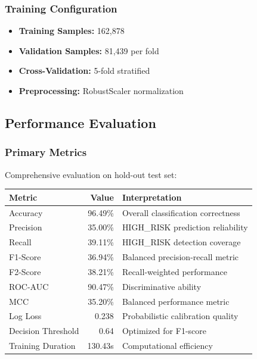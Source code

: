 \documentclass[11pt]{article}
\begin{document}
\subsubsection{Training Configuration}
\begin{itemize}[leftmargin=*]
\item \textbf{Training Samples:} 162,878
\item \textbf{Validation Samples:} 81,439 per fold
\item \textbf{Cross-Validation:} 5-fold stratified
\item \textbf{Preprocessing:} RobustScaler normalization
\end{itemize}

\subsection{Performance Evaluation}\label{sec:performance}

\subsubsection{Primary Metrics}
Comprehensive evaluation on hold-out test set:

\begin{center}
\begin{tabular}{l r l}
\toprule
\textbf{Metric} & \textbf{Value} & \textbf{Interpretation} \\
\midrule
Accuracy & 96.49\% & Overall classification correctness \\
Precision & 35.00\% & HIGH\_RISK prediction reliability \\
Recall & 39.11\% & HIGH\_RISK detection coverage \\
F1-Score & 36.94\% & Balanced precision-recall metric \\
F2-Score & 38.21\% & Recall-weighted performance \\
ROC-AUC & 90.47\% & Discriminative ability \\
MCC & 35.20\% & Balanced performance metric \\
Log Loss & 0.238 & Probabilistic calibration quality \\
\midrule
Decision Threshold & 0.64 & Optimized for F1-score \\
Training Duration & 130.43s & Computational efficiency \\
\bottomrule
\end{tabular}
\end{center}
\end{document}

